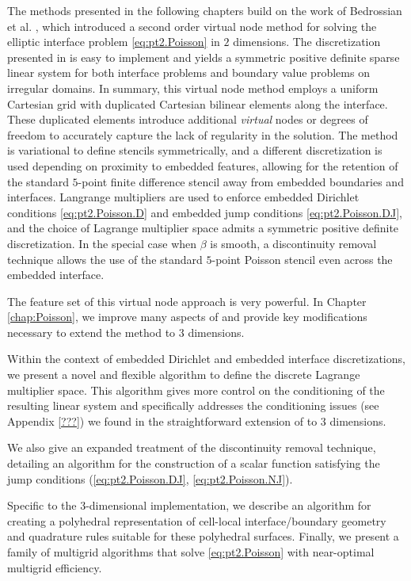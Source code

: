 The methods presented in the following chapters build on the work of Bedrossian et al. \cite{Bedrossian10}, which introduced a second order virtual node method for solving the elliptic interface problem \eqref{eq:pt2.Poisson} in $2$ dimensions. The discretization presented in \cite{Bedrossian10} is easy to implement and yields a symmetric positive definite sparse linear system for both interface problems and boundary value problems on irregular domains. In summary, this virtual node method employs a uniform Cartesian grid with duplicated Cartesian bilinear elements along the interface. These duplicated elements introduce additional \emph{virtual} nodes or degrees of freedom to accurately capture the lack of regularity in the solution. The method is variational to define stencils symmetrically, and a different discretization is used depending on proximity to embedded features, allowing for the retention of the standard $5$-point finite difference stencil away from embedded boundaries and interfaces. Langrange multipliers are used to enforce embedded Dirichlet conditions \eqref{eq:pt2.Poisson.D} and embedded jump conditions \eqref{eq:pt2.Poisson.DJ}, and the choice of Lagrange multiplier space admits a symmetric positive definite discretization. In the special case when $\beta$ is smooth, a discontinuity removal technique allows the use of the standard $5$-point Poisson stencil even across the embedded interface.

The feature set of this virtual node approach is very powerful. In Chapter \ref{chap:Poisson}, we improve many aspects of \cite{Bedrossian10} and provide key modifications necessary to extend the method to $3$ dimensions.


Within the context of embedded Dirichlet and embedded interface discretizations, we present a novel and flexible algorithm to define the discrete Lagrange multiplier space. This algorithm gives more control on the conditioning of the resulting linear system and specifically addresses the conditioning issues (see Appendix \ref{???}) we found in the straightforward extension of \cite{Bedrossian10} to $3$ dimensions.

We also give an expanded treatment of the discontinuity removal technique, detailing an algorithm for the construction of a scalar function satisfying the jump conditions (\ref{eq:pt2.Poisson.DJ}, \ref{eq:pt2.Poisson.NJ}).

Specific to the $3$-dimensional implementation, we describe an algorithm for creating a polyhedral representation of cell-local interface/boundary geometry and quadrature rules suitable for these polyhedral surfaces. Finally, we present a family of multigrid algorithms that solve \eqref{eq:pt2.Poisson} with near-optimal multigrid efficiency.








